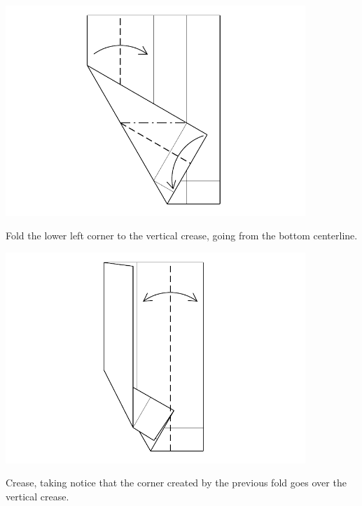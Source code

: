 \documentclass[11pt]{article}
\begin{document}
\begin{minipage}[t]{0.45\textwidth}
  \includegraphics[width=0.85\textwidth]{../figs/fig03b-06}
  \begin{itemize}{\item[6.] Fold the lower left corner to the  vertical crease, going from the bottom centerline.}\end{itemize}
\end{minipage}
\hfill
\begin{minipage}[t]{0.45\textwidth}
  \includegraphics[width=0.85\textwidth]{../figs/fig03b-07}
  \begin{itemize}{\item[7.] Crease, taking notice that the corner created by the previous fold goes over the  vertical crease.}\end{itemize}
\end{minipage}

\vspace*{0.5in}
\end{document}
